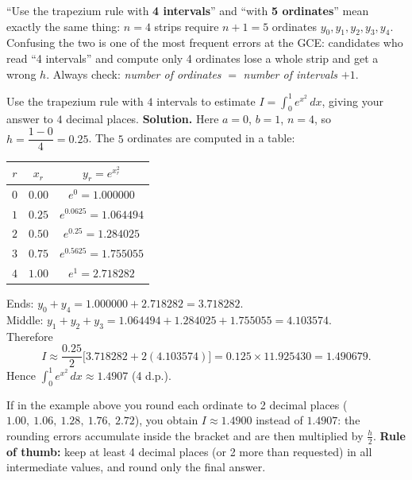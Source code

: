\documentclass[11pt]{article}
\begin{document}
\begin{attention}
``Use the trapezium rule with \textbf{4 intervals}'' and ``with \textbf{5 ordinates}'' mean exactly the same thing: $n = 4$ strips require $n + 1 = 5$ ordinates $y_0, y_1, y_2, y_3, y_4$. Confusing the two is one of the most frequent errors at the GCE: candidates who read ``4 intervals'' and compute only 4 ordinates lose a whole strip and get a wrong $h$. Always check: \emph{number of ordinates} $=$ \emph{number of intervals} $+ 1$.
\end{attention}

\begin{exoresolu}
Use the trapezium rule with $4$ intervals to estimate $\displaystyle I = \int_0^1 e^{x^2}\,dx$, giving your answer to $4$ decimal places.
\tcblower
\textbf{Solution.} Here $a = 0$, $b = 1$, $n = 4$, so $h = \dfrac{1-0}{4} = 0.25$. The $5$ ordinates are computed in a table:
\begin{center}
\begin{tabular}{|c|c|c|}
\hline
\rowcolor{popblueL} $r$ & $x_r$ & $y_r = e^{x_r^2}$ \\ \hline
$0$ & $0.00$ & $e^{0} = 1.000000$ \\ \hline
$1$ & $0.25$ & $e^{0.0625} = 1.064494$ \\ \hline
$2$ & $0.50$ & $e^{0.25} = 1.284025$ \\ \hline
$3$ & $0.75$ & $e^{0.5625} = 1.755055$ \\ \hline
$4$ & $1.00$ & $e^{1} = 2.718282$ \\ \hline
\end{tabular}
\end{center}
Ends: $y_0 + y_4 = 1.000000 + 2.718282 = 3.718282$.\\
Middle: $y_1 + y_2 + y_3 = 1.064494 + 1.284025 + 1.755055 = 4.103574$.\\[2pt]
Therefore
\[
I \approx \frac{0.25}{2}\bigl[3.718282 + 2(4.103574)\bigr] = 0.125 \times 11.925430 = 1.490679.
\]
Hence $\displaystyle\int_0^1 e^{x^2}\,dx \approx 1.4907$ (4 d.p.).
\end{exoresolu}

\begin{attention}
If in the example above you round each ordinate to 2 decimal places ($1.00,\ 1.06,\ 1.28,\ 1.76,\ 2.72$), you obtain $I \approx 1.4900$ instead of $1.4907$: the rounding errors accumulate inside the bracket and are then multiplied by $\frac{h}{2}$. \textbf{Rule of thumb:} keep at least 4 decimal places (or 2 more than requested) in all intermediate values, and round only the final answer.
\end{attention}
\end{document}
